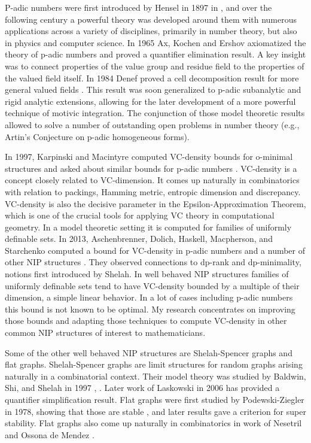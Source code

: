 P-adic numbers were first introduced by Hensel in 1897 in \cite{hensel}, and over the following century a powerful theory was developed around them with numerous applications across a variety of disciplines, primarily in number theory, but also in physics and computer science.
In 1965 Ax, Kochen \cite{ak1} and Ershov \cite{er1} axiomatized the theory of p-adic numbers and proved a quantifier elimination result.
A key insight was to connect properties of the value group and residue field to the properties of the valued field itself.
In 1984 Denef proved a cell decomposition result for more general valued fields \cite{den84}.
This result was soon generalized to p-adic subanalytic and rigid analytic extensions, allowing for the later development of a more powerful technique of motivic integration.
The conjunction of those model theoretic results allowed to solve a number of outstanding open problems in number theory (e.g., Artin's Conjecture on p-adic homogeneous forms).

In 1997, Karpinski and Macintyre computed VC-density bounds for o-minimal structures and asked about similar bounds for p-adic numbers \cite{karp97}.
VC-density is a concept closely related to VC-dimension.
It comes up naturally in combinatorics with relation to packings, Hamming metric, entropic dimension and discrepancy.
 VC-density is also the decisive parameter in the Epsilon-Approximation Theorem, which is one of the crucial tools for applying VC theory in computational geometry.
In a model theoretic setting it is computed for families of uniformly definable sets.
 In 2013, Aschenbrenner, Dolich, Haskell, Macpherson, and Starchenko computed a bound for VC-density in p-adic numbers and a number of other NIP structures \cite{density}.
They observed connections to dp-rank and dp-minimality, notions first introduced by Shelah.
In well behaved NIP structures families of uniformly definable sets tend to have VC-density bounded by a multiple of their dimension, a simple linear behavior.
In a lot of cases including p-adic numbers this bound is not known to be optimal.
My research concentrates on improving those bounds and adapting those techniques to compute VC-density in other common NIP structures of interest to mathematicians.

Some of the other well behaved NIP structures are Shelah-Spencer graphs and flat graphs.
Shelah-Spencer graphs are limit structures for random graphs arising naturally in a combinatorial context.
Their model theory was studied by Baldwin, Shi, and Shelah in 1997 \cite{shi}, \cite{baldwin}.
Later work of Laskowski in 2006 \cite{laskowski} has provided a quantifier simplification result.
 Flat graphs were first studied by Podewski-Ziegler in 1978, showing that those are stable \cite{stable_graphs}, and later results gave a criterion for super stability.
Flat graphs also come up naturally in combinatorics in work of Nesetril and Ossona de Mendez \cite{nowhere}.

